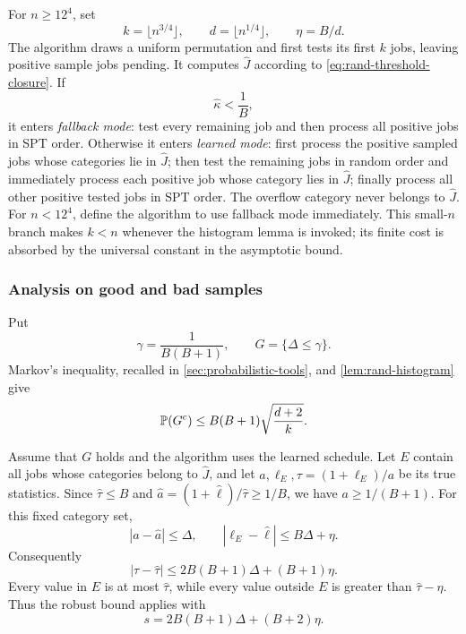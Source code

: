 For $n\ge12^4$, set
\begin{equation}
 k=\lfloor n^{3/4}\rfloor,\qquad
 d=\lfloor n^{1/4}\rfloor,\qquad \eta=B/d.
 \label{eq:rand-parameters}
\end{equation}
The algorithm draws a uniform permutation and first tests its first $k$ jobs,
leaving positive sample jobs pending.  It computes $\widehat J$ according to
\cref{eq:rand-threshold-closure}.
If
\begin{equation}
 \widehat\kappa<\frac1B,
 \label{eq:rand-fallback-test}
\end{equation}
it enters \emph{fallback mode}: test every remaining job and then process all
positive jobs in SPT order.  Otherwise it enters \emph{learned mode}: first
process the positive sampled jobs whose categories lie in $\widehat J$;
then test the remaining jobs in random order and immediately process each
positive job whose category lies in $\widehat J$; finally process all other
positive tested jobs in SPT order.  The overflow category never belongs to
$\widehat J$.
For $n<12^4$, define the algorithm to use fallback mode immediately.  This
small-$n$ branch makes $k<n$ whenever the histogram lemma is invoked; its
finite cost is absorbed by the universal constant in the asymptotic bound.

\subsubsection{Analysis on good and bad samples}

Put
\begin{equation}
 \gamma=\frac1{B(B+1)},\qquad G=\{\Delta\le\gamma\}.
 \label{eq:rand-good-event}
\end{equation}
Markov's inequality, recalled in \cref{sec:probabilistic-tools}, and
\cref{lem:rand-histogram} give
\begin{equation}
 \mathbb{P}(G^c)\le B(B+1)\sqrt{\frac{d+2}{k}}.
 \label{eq:rand-bad-probability}
\end{equation}

Assume that $G$ holds and the algorithm uses the learned schedule.  Let $E$
contain all jobs whose categories belong to $\widehat J$, and let
$a,\ell_E,\tau=(1+\ell_E)/a$ be its true statistics.
Since $\widehat\tau\le B$ and
$\widehat a=(1+\widehat\ell)/\widehat\tau\ge1/B$, we have
$a\ge1/(B+1)$.  For
this fixed category set,
\[
 |a-\widehat a|\le\Delta,\qquad
 |\ell_E-\widehat\ell|\le B\Delta+\eta.
\]
Consequently
\begin{equation}
 |\tau-\widehat\tau|
 \le2B(B+1)\Delta+(B+1)\eta.
 \label{eq:rand-threshold-transfer}
\end{equation}
Every value in $E$ is at most $\widehat\tau$, while every value outside $E$
is greater than $\widehat\tau-\eta$.  Thus the robust bound applies
with
\begin{equation}
 s=2B(B+1)\Delta+(B+2)\eta.
 \label{eq:rand-robust-s}
\end{equation}

